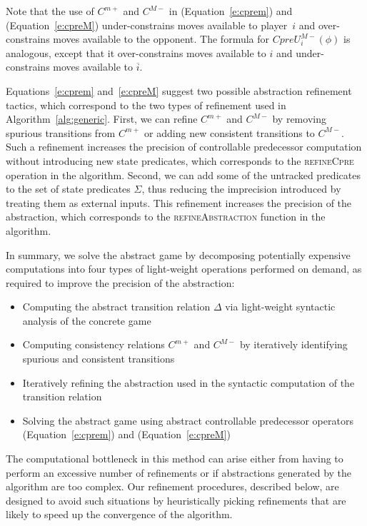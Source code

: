 Note that the use of $C^{m+}$ and $C^{M-}$ in (Equation~\ref{e:cprem}) and (Equation~\ref{e:cpreM}) under-constrains moves available to player~$i$ and over-constrains moves available to the opponent.  The formula for $CpreU_i^{M-}(\phi)$ is analogous, except that it over-constrains moves available to $i$ and under-constrains moves available to $\overline{i}$.

Equations~\ref{e:cprem} and~\ref{e:cpreM} suggest two possible abstraction refinement tactics, which correspond to the two types of refinement used in Algorithm~\ref{alg:generic}.  First, we can refine $C^{m+}$ and $C^{M-}$ by removing spurious transitions from $C^{m+}$ or adding new consistent transitions to $C^{M-}$.  Such a refinement increases the precision of controllable predecessor computation without introducing new state predicates, which corresponds to the \textsc{refineCpre} operation in the algorithm.  Second, we can add some of the untracked predicates to the set of state predicates $\Sigma$, thus reducing the imprecision introduced by treating them as external inputs.  This refinement increases the precision of the abstraction, which corresponds to the \textsc{refineAbstraction} function in the algorithm.

In summary, we solve the abstract game by decomposing potentially expensive computations into four types of light-weight operations performed on demand, as required to improve the precision of the abstraction:

\begin{itemize}
    \item Computing the abstract transition relation $\Delta$ via light-weight syntactic analysis of the concrete game
    \item Computing consistency relations $C^{m+}$ and $C^{M-}$ by iteratively identifying spurious and consistent transitions
    \item Iteratively refining the abstraction used in the syntactic computation of the transition relation
    \item Solving the abstract game using abstract controllable predecessor operators (Equation~\ref{e:cprem}) and (Equation~\ref{e:cpreM})
\end{itemize}

The computational bottleneck in this method can arise either from having to perform an excessive number of refinements or if abstractions generated by the algorithm are too complex.  Our refinement procedures, described below, are designed to avoid such situations by heuristically picking refinements that are likely to speed up the convergence of the algorithm.

